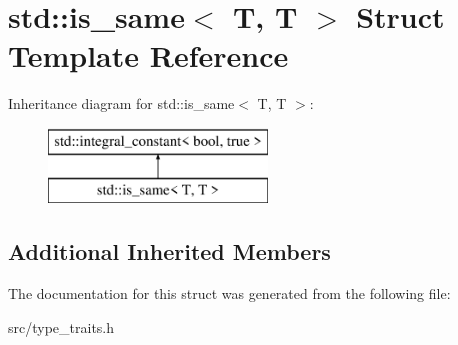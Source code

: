 \hypertarget{structstd_1_1is__same_3_01T_00_01T_01_4}{}\section{std\+:\+:is\+\_\+same$<$ T, T $>$ Struct Template Reference}
\label{structstd_1_1is__same_3_01T_00_01T_01_4}
Inheritance diagram for std\+:\+:is\+\_\+same$<$ T, T $>$\+:\begin{figure}[H]
\begin{center}
\leavevmode
\includegraphics[height=2.000000cm]{d1/db4/structstd_1_1is__same_3_01T_00_01T_01_4}
\end{center}
\end{figure}
\subsection*{Additional Inherited Members}


The documentation for this struct was generated from the following file\+:\begin{DoxyCompactItemize}
\item 
src/type\+\_\+traits.\+h\end{DoxyCompactItemize}
